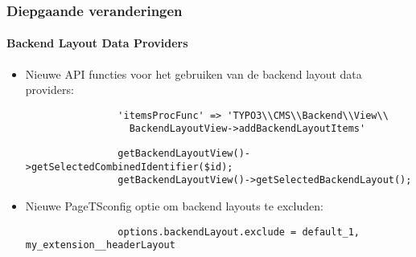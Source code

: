 \begin{frame}[fragile]
	\frametitle{Diepgaande veranderingen}
	\framesubtitle{Backend Layout Data Providers}

	\begin{itemize}
		\item Nieuwe API functies voor het gebruiken van de backend layout data providers:

			\begin{lstlisting}
				'itemsProcFunc' => 'TYPO3\\CMS\\Backend\\View\\
				  BackendLayoutView->addBackendLayoutItems'
			\end{lstlisting}

			\begin{lstlisting}
				getBackendLayoutView()->getSelectedCombinedIdentifier($id);
				getBackendLayoutView()->getSelectedBackendLayout();
			\end{lstlisting}

		\item Nieuwe PageTSconfig optie om backend layouts te excluden:

			\begin{lstlisting}
				options.backendLayout.exclude = default_1, my_extension__headerLayout
			\end{lstlisting}

	\end{itemize}

\end{frame}


